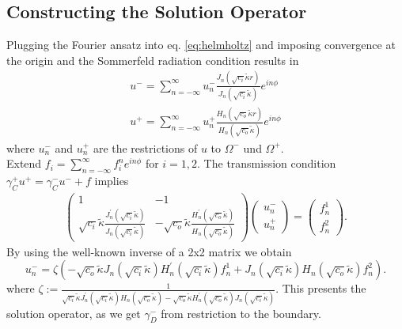 \documentclass[12pt,journal,compsoc, onecolumn]{IEEEtran}
\begin{document}
\subsection{Constructing the Solution Operator}
Plugging the Fourier ansatz into eq. \ref{eq:helmholtz} and imposing convergence at the origin and 
the Sommerfeld radiation condition results in
\begin{align}
    u^- = \sum\limits_{n = -\infty}^\infty u_n^- \frac{J_n(\sqrt{ c_i} \tilde \kappa r)}{J_n(\sqrt{ c_i} \tilde \kappa)} e^{i n \phi} \nonumber \\
    u^+ = \sum\limits_{n = -\infty}^\infty u_n^+ \frac{H_n(\sqrt{ c_o} \tilde \kappa r)}{H_n(\sqrt{ c_o} \tilde \kappa)} e^{i n \phi} \nonumber
\end{align}
where $u_n^-$ and $u_n^+$ are the restrictions of $u$ to $\Omega^-$ und $\Omega^+$.\\
Extend $f_i = \sum\limits_{n = -\infty}^\infty f_i^n e^{in\phi}$ for $i=1,2$. The transmission condition $\gamma_{C}^{+} u^{+}=\gamma_{C}^{-} u^{-}+f$ implies 
\begin{align}
    \begin{pmatrix}
        1 & -1 \\
        \sqrt{c_i} \tilde \kappa \frac{J_n^\prime(\sqrt{c_i} \tilde \kappa)}{J_n(\sqrt{c_i} \tilde \kappa)} & 
        -  \sqrt{c_o} \tilde \kappa \frac{H_n^\prime(\sqrt{c_o} \tilde \kappa)}{H_n(\sqrt{c_o} \tilde \kappa)}
    \end{pmatrix} 
    \begin{pmatrix}
        u_n^- \\u_n^+
    \end{pmatrix}
    = 
    \begin{pmatrix}
        f_n^1 \\ f_n^2
    \end{pmatrix}.
\end{align} 
By using the well-known inverse of a 2x2 matrix we obtain 
\begin{equation}
    u_n^- = \zeta(-\sqrt{c_o}\tilde \kappa J_n(\sqrt{c_i} \tilde \kappa) H_n^\prime(\sqrt{c_i} \tilde \kappa)f_n^1 
    + J_n(\sqrt{c_i} \tilde \kappa) H_n(\sqrt{c_o} \tilde \kappa) f_n^2).
\end{equation}
where $\zeta := \frac{1}{\sqrt{c_i} \tilde \kappa J_n^\prime(\sqrt{c_i} \tilde \kappa) H_n(\sqrt{c_o} \tilde \kappa)
-\sqrt{c_o} \tilde \kappa H_n^\prime(\sqrt{c_o}\tilde \kappa) J_n(\sqrt{c_i} \tilde \kappa)
}$.
This presents the solution operator, as we get $\gamma_D^-$ from restriction to the boundary.
\end{document}
